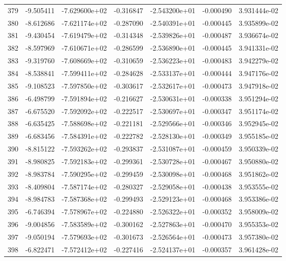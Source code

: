 \begin{tabular}{rrrrrrr}
 379 &  -9.505411 & -7.629600e+02 & -0.316847 & -2.543200e+01 &   -0.000490 &  3.931444e-02 \\
 380 &  -8.612686 & -7.621174e+02 & -0.287090 & -2.540391e+01 &   -0.000445 &  3.935899e-02 \\
 381 &  -9.430454 & -7.619479e+02 & -0.314348 & -2.539826e+01 &   -0.000487 &  3.936674e-02 \\
 382 &  -8.597969 & -7.610671e+02 & -0.286599 & -2.536890e+01 &   -0.000445 &  3.941331e-02 \\
 383 &  -9.319760 & -7.608669e+02 & -0.310659 & -2.536223e+01 &   -0.000483 &  3.942279e-02 \\
 384 &  -8.538841 & -7.599411e+02 & -0.284628 & -2.533137e+01 &   -0.000444 &  3.947176e-02 \\
 385 &  -9.108523 & -7.597850e+02 & -0.303617 & -2.532617e+01 &   -0.000473 &  3.947918e-02 \\
 386 &  -6.498799 & -7.591894e+02 & -0.216627 & -2.530631e+01 &   -0.000338 &  3.951294e-02 \\
 387 &  -6.675520 & -7.592092e+02 & -0.222517 & -2.530697e+01 &   -0.000347 &  3.951174e-02 \\
 388 &  -6.635425 & -7.588698e+02 & -0.221181 & -2.529566e+01 &   -0.000346 &  3.952945e-02 \\
 389 &  -6.683456 & -7.584391e+02 & -0.222782 & -2.528130e+01 &   -0.000349 &  3.955185e-02 \\
 390 &  -8.815122 & -7.593262e+02 & -0.293837 & -2.531087e+01 &   -0.000459 &  3.950339e-02 \\
 391 &  -8.980825 & -7.592183e+02 & -0.299361 & -2.530728e+01 &   -0.000467 &  3.950880e-02 \\
 392 &  -8.983784 & -7.590295e+02 & -0.299459 & -2.530098e+01 &   -0.000468 &  3.951862e-02 \\
 393 &  -8.409804 & -7.587174e+02 & -0.280327 & -2.529058e+01 &   -0.000438 &  3.953555e-02 \\
 394 &  -8.984783 & -7.587368e+02 & -0.299493 & -2.529123e+01 &   -0.000468 &  3.953386e-02 \\
 395 &  -6.746394 & -7.578967e+02 & -0.224880 & -2.526322e+01 &   -0.000352 &  3.958009e-02 \\
 396 &  -9.004856 & -7.583589e+02 & -0.300162 & -2.527863e+01 &   -0.000470 &  3.955353e-02 \\
 397 &  -9.050194 & -7.579693e+02 & -0.301673 & -2.526564e+01 &   -0.000473 &  3.957380e-02 \\
 398 &  -6.822471 & -7.572412e+02 & -0.227416 & -2.524137e+01 &   -0.000357 &  3.961428e-02 \\

\end{tabular}
